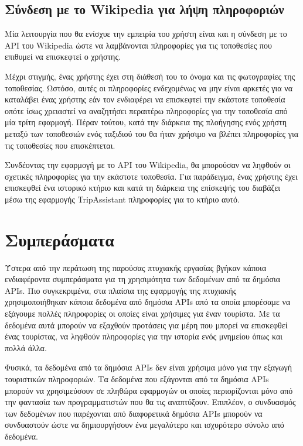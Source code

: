 \documentclass[oneside, 12pt]{book}
\begin{document}
\subsection{Σύνδεση με το Wikipedia για λήψη πληροφοριών}
Μία λειτουργία που θα ενίσχυε την εμπειρία του χρήστη είναι και η σύνδεση με το API του Wikipedia ώστε να λαμβάνονται πληροφορίες για τις τοποθεσίες που επιθυμεί να επισκεφτεί ο χρήστης. 

Μέχρι στιγμής, ένας χρήστης έχει στη διάθεσή του το όνομα και τις φωτογραφίες της τοποθεσίας. Ωστόσο, αυτές οι πληροφορίες ενδεχομένως να μην είναι αρκετές για να καταλάβει ένας χρήστης εάν τον ενδιαφέρει να επισκεφτεί την εκάστοτε τοποθεσία οπότε ίσως χρειαστεί να αναζητήσει περαιτέρω πληροφορίες για την τοποθεσία από μία τρίτη εφαρμογή. Πέραν τούτου, κατά την διάρκεια της πλοήγησης ενός χρήστη μεταξύ των τοποθεσιών ενός ταξιδιού του θα ήταν χρήσιμο να βλέπει πληροφορίες για τις τοποθεσίες που επισκέπτεται.

Συνδέοντας την εφαρμογή με το API του Wikipedia, θα μπορούσαν να ληφθούν οι σχετικές πληροφορίες για την εκάστοτε τοποθεσία.  
Για παράδειγμα, ένας χρήστης έχει επισκεφθεί ένα ιστορικό κτήριο και κατά τη διάρκεια της επίσκεψής του διαβάζει μέσω της εφαρμογής TripAssistant πληροφορίες για το κτήριο αυτό.

\section{Συμπεράσματα}
Ύστερα από την περάτωση της παρούσας πτυχιακής εργασίας βγήκαν κάποια ενδιαφέροντα συμπεράσματα για τη χρησιμότητα των δεδομένων από τα δημόσια APIs.
Πιο συγκεκριμένα, στα πλαίσια της εφαρμογής της πτυχιακής χρησιμοποιήθηκαν κάποια δεδομένα από δημόσια APIs από τα οποία
μπορέσαμε να εξάγουμε πολλές πληροφορίες οι οποίες είναι χρήσιμες για έναν τουρίστα. 
Με τα δεδομένα αυτά μπορούν να εξαχθούν προτάσεις για μέρη που μπορεί να επισκεφθεί ένας τουρίστας, να ληφθούν πληροφορίες για 
την ιστορία ενός μνημείου όπως και πολλά άλλα.

Φυσικά, τα δεδομένα από τα δημόσια APIs δεν είναι χρήσιμα μόνο για την εξαγωγή τουριστικών πληροφοριών. 
Τα δεδομένα που εξάγονται από τα δημόσια APIs μπορούν να χρησιμεύσουν σε πληθώρα εφαρμογών οι οποίες 
περιορίζονται μόνο από την φαντασία των προγραμματιστών που θα τις αναπτύξουν.
Επιπλέον, ο συνδυασμός των δεδομένων που παρέχονται από διαφορετικά δημόσια APIs μπορούν να συνδυαστούν ώστε να δημιουργήσουν ένα μεγαλύτερο και ισχυρότερο σύνολο από δεδομένα.
\end{document}
